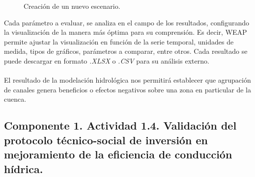 \documentclass[]{article}
\begin{document}
\begin{itemize}
\begin{figure}[H]
\begin{center}
\caption{Creación de un nuevo escenario.}
\label{etiqueta_figura7}
\end{center}
\end{figure}

Cada parámetro a evaluar, se analiza en el campo de los resultados, configurando la visualización de la manera más óptima para su comprensión. Es decir, WEAP permite ajustar la visualización en función de la serie temporal, unidades de medida, tipos de gráficos, parámetros a comparar, entre otros. Cada resultado se puede descargar en formato \textit{.XLSX} o \textit{.CSV} para su análisis externo.\\
\\
El resultado de la modelación hidrológica nos permitirá establecer que agrupación de canales genera beneficios o efectos negativos sobre una zona en particular de la cuenca.

\end{itemize}

\subsection{Componente 1. Actividad 1.4. Validación del protocolo técnico-social de inversión en mejoramiento de la eficiencia de conducción hídrica.}
\end{document}
